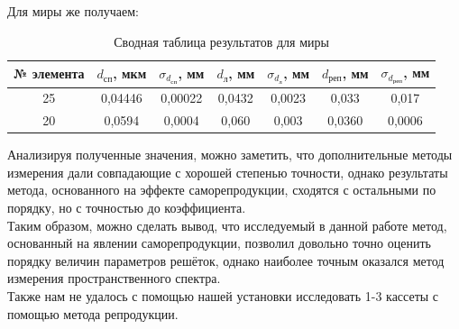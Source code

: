 \documentclass[a4paper,12pt]{extarticle}
\begin{document}
Для миры же получаем: 
\begin{table}[H]
\begin{tabular}{|c|c|c|c|c|c|c|}
\hline
№ элемента & $d_\text{сп}$, мкм & $\sigma_{d_\text{сп}}$, мм & $d_\text{л}$, мм & $\sigma_{d_\text{л}}$, мм & $d_\text{реп}$, мм & $\sigma_{d_\text{реп}}$, мм \\ \hline
25 & 0,04446 & 0,00022 & 0,0432 & 0,0023 & 0,033 & 0,017 \\ \hline
20 & 0,0594 & 0,0004 & 0,060 & 0,003 & 0,0360 &	0,0006 \\ \hline
\end{tabular}
\caption{Сводная таблица результатов для миры}
\end{table}
Анализируя полученные значения, можно заметить, что дополнительные методы измерения дали совпадающие с хорошей степенью точности, однако результаты метода, основанного на эффекте саморепродукции, сходятся с остальными по порядку, но с точностью до коэффициента.\\
Таким образом, можно сделать вывод, что исследуемый в данной работе метод, основанный на явлении саморепродукции, позволил довольно точно оценить порядку величин параметров решёток, однако наиболее точным оказался метод измерения пространственного спектра.\\
Также нам не удалось с помощью нашей установки исследовать 1-3 кассеты с помощью метода репродукции.
\end{document}
